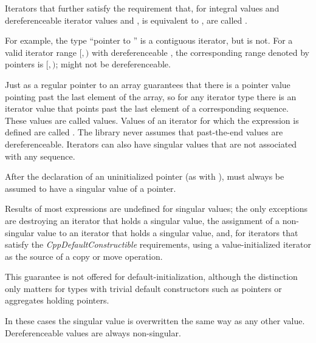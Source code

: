 \pnum
Iterators that further satisfy the requirement that,
for integral values  and
dereferenceable iterator values  and ,
 is equivalent to ,
are called .
\begin{note}
For example, the type ``pointer to '' is a contiguous iterator,
but  is not.
For a valid iterator range $[$$, $$)$ with dereferenceable ,
the corresponding range denoted by pointers is
$[$$, $$)$;
 might not be dereferenceable.
\end{note}

\pnum
Just as a regular pointer to an array guarantees that there is a pointer value pointing past the last element
of the array, so for any iterator type there is an iterator value that points past the last element of a
corresponding sequence.
These values are called
values.
Values of an iterator
for which the expression
is defined are called
.
The library never assumes that past-the-end values are dereferenceable.
Iterators can also have singular values that are not associated with any
sequence.
\begin{example}
After the declaration of an uninitialized pointer
(as with
),
must always be assumed to have a singular value of a pointer.
\end{example}
Results of most expressions are undefined for singular values;
the only exceptions are destroying an iterator that holds a singular value,
the assignment of a non-singular value to
an iterator that holds a singular value, and, for iterators that satisfy the
\textit{CppDefaultConstructible} requirements, using a value-initialized iterator
as the source of a copy or move operation. \begin{note} This guarantee is not
offered for default-initialization, although the distinction only matters for types
with trivial default constructors such as pointers or aggregates holding pointers.
\end{note}
In these cases the singular
value is overwritten the same way as any other value.
Dereferenceable
values are always non-singular.


